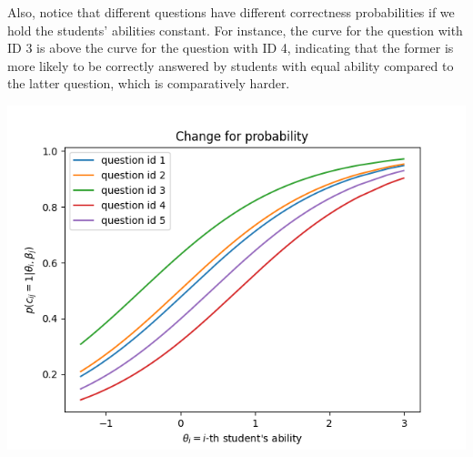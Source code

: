 \documentclass{article}
\begin{document}
\begin{enumerate}[label=\arabic*.]
\begin{enumerate}[label=(\alph*)]
            Also, notice that different questions have different correctness probabilities if we hold the students' abilities constant. For instance, the curve for the question with ID 3 is above the curve for the question with ID 4, indicating that the former is more likely to be correctly answered by students with equal ability compared to the latter question, which is comparatively harder.
                \begin{center}
                    \includegraphics[width=0.6\linewidth]{../starter_code/figs/irt.png}
                \end{center}
        \end{enumerate}
        

\end{enumerate}
\end{document}
